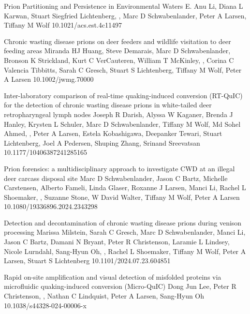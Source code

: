 \documentclass{resume}
\begin{document}
        \begin{samepage}
            {Prion Partitioning and Persistence in Environmental Waters}
            {E. Anu Li, Diana L Karwan, Stuart Siegfried Lichtenberg, \me{}, Marc D Schwabenlander, Peter A Larsen, Tiffany M Wolf}
            {10.1021/acs.est.4c11497}

            {Chronic wasting disease prions on deer feeders and wildlife visitation to deer feeding areas}
            {Miranda HJ Huang, Steve Demarais, Marc D Schwabenlander, Bronson K Strickland, Kurt C VerCauteren, William T McKinley, \me{}, Corina C Valencia Tibbitts, Sarah C Gresch, Stuart S Lichtenberg, Tiffany M Wolf, Peter A Larsen}
            {10.1002/jwmg.70000}

            {Inter-laboratory comparison of real-time quaking-induced conversion (RT-QuIC) for the detection of chronic wasting disease prions in white-tailed deer retropharyngeal lymph nodes}
            {Joseph R Darish, Alyssa W Kaganer, Brenda J Hanley, Krysten L Schuler, Marc D Schwabenlander, Tiffany M Wolf, Md Sohel Ahmed, \me{}, Peter A Larsen, Estela Kobashigawa, Deepanker Tewari, Stuart Lichtenberg, Joel A Pedersen, Shuping Zhang, Srinand Sreevatsan}
            {10.1177/10406387241285165}

            {Prion forensics: a multidisciplinary approach to investigate CWD at an illegal deer carcass disposal site}
            {Marc D Schwabenlander, Jason C Bartz, Michelle Carstensen, Alberto Fameli, Linda Glaser, Roxanne J Larsen, Manci Li, Rachel L Shoemaker, \me{}, Suzanne Stone, W David Walter, Tiffany M Wolf, Peter A Larsen}
            {10.1080/19336896.2024.2343298}

            {Detection and decontamination of chronic wasting disease prions during venison processing}
            {Marissa Milstein, Sarah C Gresch, Marc D Schwabenlander, Manci Li, Jason C Bartz, Damani N Bryant, Peter R Christenson, Laramie L Lindsey, Nicole Lurndahl, Sang-Hyun Oh, \me{}, Rachel L Shoemaker, Tiffany M Wolf, Peter A Larsen, Stuart S Lichtenberg}
            {10.1101/2024.07.23.604851}

            {Rapid on-site amplification and visual detection of misfolded proteins via microfluidic quaking-induced conversion (Micro-QuIC)}
            {Dong Jun Lee, Peter R Christenson, \me{}, Nathan C Lindquist, Peter A Larsen, Sang-Hyun Oh}
            {10.1038/s44328-024-00006-x}


\end{samepage}
\end{document}

